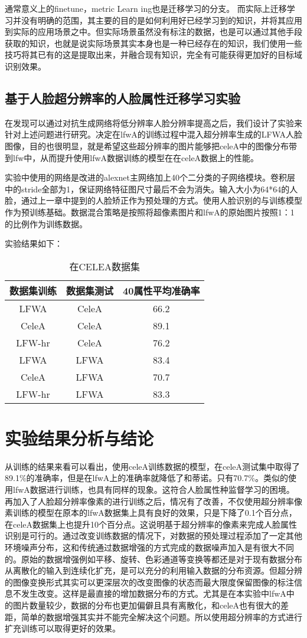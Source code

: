 通常意义上的finetune，metric Learn ing也是迁移学习的分支。
而实际上迁移学习并没有明确的范围，其主要的目的是如何利用好已经学习到的知识，并将其应用到实际的应用场景之中。但实际场景虽然没有标注的数据，也是可以通过其他手段获取的知识，也就是说实际场景其实本身也是一种已经存在的知识，我们使用一些技巧将其已有的这是提取出来，并融合现有知识，完全有可能获得更加好的目标域识别效果。
\subsection{基于人脸超分辨率的人脸属性迁移学习实验}
在发现可以通过对抗生成网络将低分辨率人脸分辨率提高之后，我们设计了实验来针对上述问题进行研究。决定在lfwA的训练过程中混入超分辨率生成的LFWA人脸图像，目的也很明显，就是希望这些超分辨率的图片能够把celeA中的图像分布带到lfw中，从而提升使用lfwA数据训练的模型在在celeA数据上的性能。

实验中使用的网络是改进的alexnet主网络加上40个二分类的子网络模块。卷积层中的stride全部为1，保证网络特征图尺寸最后不会为消失。输入大小为64*64的人脸，通过上一章中提到的人脸矫正作为预处理的方式。使用人脸识别的与训练模型作为预训练基础。数据混合策略是按照将超像素图片和lfwA的原始图片按照1：1的比例作为训练数据。

实验结果如下：
\begin{table}[!h]
  \centering
   \caption{在CELEA数据集}
   \begin{tabular}{c|c|c}
     \toprule
     数据集训练 &数据集测试 &40属性平均准确率\\
     \midrule
      LFWA   &  CeleA &  66.2 \\
	  CeleA  &  CeleA &  89.1 \\
	  LFW-hr &  CeleA &  76.2 \\
      LFWA   &  LFWA  &  83.4 \\
	  CeleA  &  LFWA  &  70.7 \\
	  LFW-hr &  LFWA  &  83.3 \\
     \bottomrule
   \end{tabular}
\end{table}
\section{实验结果分析与结论}
从训练的结果来看可以看出，使用celeA训练数据的模型，在celeA测试集中取得了89.1\%的准确率，但是在lfwA上的准确率就降低了和蒂诺。只有70.7\%。类似的使用lfwA数据进行训练，也具有同样的现象。这符合人脸属性种监督学习的困境。
再加入了人脸超分辨率像素的进行训练之后，情况有了改善，不仅使用超分辨率像素训练的模型在原本的lfwA数据集上具有良好的效果，只是下降了0.1个百分点，在celeA数据集上也提升10个百分点。这说明基于超分辨率的像素来完成人脸属性识别是可行的。通过改变训练数据的情况下，对数据的预处理过程添加了一定其他环境噪声分布，这和传统通过数据增强的方式完成的数据噪声加入是有很大不同的。原始的数据增强例如平移、旋转、色彩通道等变换等都还是对于现有数据分布从离散化的输入到连续化扩充，是可以充分的利用输入数据的分布资源。但超分辨的图像变换形式其实可以更深层次的改变图像的状态而最大限度保留图像的标注信息不发生改变。这样是最直接的增加数据分布的方式。尤其是在本实验中lfwA中的图片数量较少，数据的分布也更加偏僻且具有离散化，和celeA也有很大的差距，简单的数据增强其实并不能完全解决这个问题。所以使用超分辨率的方式进行扩充训练可以取得更好的效果。

